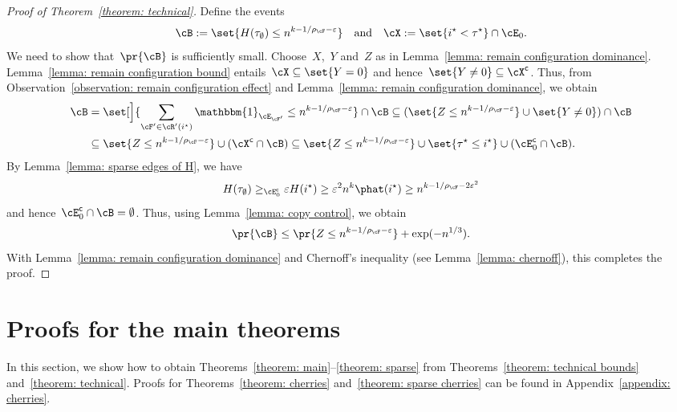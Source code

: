 \documentclass[11pt]{amsart}
\newcommand{\eps}{\varepsilon}
\DeclarePairedDelimiter{\paren}{\lparen}{\rparen}
\newcommand{\ind}{\mathbbm{1}}
\newcommand{\qtand}{\quad\text{and}\quad}
\newcommand{\comp}{{\mathsf{c}}}
\theoremstyle{definition}
\numberwithin{equation}{section}
\begin{document}
	\begin{proof}[Proof of Theorem~\ref{theorem: technical}]
		Define the events
		\begin{equation*}
			\cB:=\set{ H(\tau_\emptyset)\leq n^{k-1/\rho_\cF-\eps} }\qtand
			\cX:=\set{i^\star<\tau^\star}\cap \cE_0.
		\end{equation*}
		We need to show that~$\pr{\cB}$ is sufficiently small.
		Choose~$X$,~$Y$ and~$Z$ as in Lemma~\ref{lemma: remain configuration dominance}.
		Lemma~\ref{lemma: remain configuration bound} entails~$\cX\subseteq\set{Y=0}$ and hence~$\set{Y\neq 0}\subseteq \cX^\comp$.
		Thus, from Observation~\ref{observation: remain configuration effect} and Lemma~\ref{lemma: remain configuration dominance}, we obtain
		\begin{equation*}
			\begin{aligned}
				\cB
				&= \set[\Big]{\sum_{\cF'\in\cR'(i^\star)} \ind_{\cE_{\cF'}}\leq n^{k-1/\rho_\cF-\eps}}\cap\cB
				\subseteq \paren{\set{Z\leq n^{k-1/\rho_\cF-\eps}}\cup\set{Y\neq 0}}\cap\cB\\
				&\subseteq\set{Z\leq n^{k-1/\rho_\cF-\eps}}\cup(\cX^\comp\cap \cB)
				\subseteq \set{Z\leq n^{k-1/\rho_\cF-\eps}}\cup\set{\tau^\star\leq i^\star}\cup (\cE_0^\comp\cap \cB).
			\end{aligned}
		\end{equation*}
		By Lemma~\ref{lemma: sparse edges of H}, we have
		\begin{equation*}
			H(\tau_\emptyset)\geq_{\cE_0^\comp} \eps H(i^\star)\geq \eps^2 n^k\phat(i^\star)\geq n^{k-1/\rho_\cF-2\eps^2}
		\end{equation*}
		and hence~$\cE_0^\comp\cap \cB=\emptyset$.
		Thus, using Lemma~\ref{lemma: copy control}, we obtain
		\begin{equation*}
			\pr{\cB}\leq \pr{Z\leq n^{k-1/\rho_\cF-\eps}}+\exp(-n^{1/3}).
		\end{equation*}
		With Lemma~\ref{lemma: remain configuration dominance} and Chernoff's inequality (see Lemma~\ref{lemma: chernoff}), this completes the proof.
	\end{proof}
	
	\section{Proofs for the main theorems}\label{section: main proofs}
	In this section, we show how to obtain Theorems~\ref{theorem: main}--\ref{theorem: sparse} from Theorems~\ref{theorem: technical bounds} and~\ref{theorem: technical}.
	Proofs for Theorems~\ref{theorem: cherries} and~\ref{theorem: sparse cherries} can be found in Appendix~\ref{appendix: cherries}.
\end{document}
